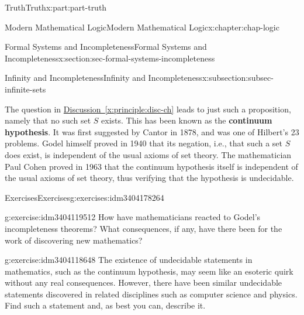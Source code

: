 \documentclass[oneside,10pt,]{book}
\newcommand{\xreffont}{\relax}
\newcommand{\terminology}[1]{\textbf{#1}}
\numberwithin{equation}{section}
\begin{document}
\begin{partptx}{Truth}{}{Truth}{}{}{x:part:part-truth}
\begin{chapterptx}{Modern Mathematical Logic}{}{Modern Mathematical Logic}{}{}{x:chapter:chap-logic}
\begin{sectionptx}{Formal Systems and Incompleteness}{}{Formal Systems and Incompleteness}{}{}{x:section:sec-formal-systems-incompleteness}
\begin{subsectionptx}{Infinity and Incompleteness}{}{Infinity and Incompleteness}{}{}{x:subsection:subsec-infinite-sets}
\par
The question in \hyperref[x:principle:disc-ch]{Discussion~{\xreffont\ref{x:principle:disc-ch}}} leads to just such a proposition, namely that no such set \(S\) exists. This has been known as the \terminology{continuum hypothesis}. It was first suggested by Cantor in 1878, and was one of Hilbert's 23 problems. Godel himself proved in 1940 that its negation, i.e., that such a set \(S\) does exist, is independent of the usual axioms of set theory. The mathematician Paul Cohen proved in 1963 that the continuum hypothesis itself is independent of the usual axioms of set theory, thus verifying that the hypothesis is undecidable.%
\end{subsectionptx}
%
%
\typeout{************************************************}
\typeout{************************************************}
%
\begin{exercises-subsection}{Exercises}{}{Exercises}{}{}{g:exercises:idm3404178264}
\begin{divisionexercise}{1}{}{}{g:exercise:idm3404119512}%
How have mathematicians reacted to Godel's incompleteness theorems? What consequences, if any, have there been for the work of discovering new mathematics?%
\end{divisionexercise}%
\begin{divisionexercise}{2}{}{}{g:exercise:idm3404118648}%
The existence of undecidable statements in mathematics, such as the continuum hypothesis, may seem like an esoteric quirk without any real consequences. However, there have been similar undecidable statements discovered in related disciplines such as computer science and physics. Find such a statement and, as best you can, describe it.%
\end{divisionexercise}%
\end{exercises-subsection}
\end{sectionptx}
\end{chapterptx}
\end{partptx}
%
%
\typeout{************************************************}
\typeout{************************************************}
%
\end{document}
